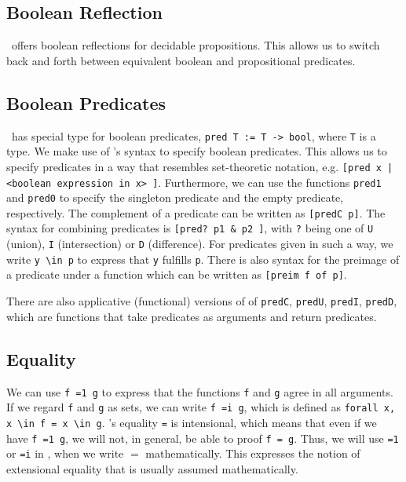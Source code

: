\subsection{Boolean Reflection}
\ssreflect\ offers boolean reflections for decidable propositions. 
This allows us to switch back and forth between equivalent boolean and propositional predicates.

\subsection{Boolean Predicates}
\ssreflect\ has special type for boolean predicates, \lstinline{pred T := T -> bool}, where \lstinline{T} is a type.
We make use of \ssreflect's syntax to specify boolean predicates.
This allows us to specify predicates in a way that resembles set-theoretic notation, e.g. 
\lstinline{[pred x | <boolean expression in x> ]}.
Furthermore, we can use the functions \lstinline{pred1} and \lstinline{pred0} to specify the singleton predicate and the empty predicate, respectively.
The complement of a predicate can be written as \lstinline{[predC p]}. 
The syntax for combining predicates is \lstinline{[pred? p1 & p2 ]}, with \lstinline{?} being one of 
\lstinline{U} (union), \lstinline{I} (intersection) or \lstinline{D} (difference).
For predicates given in such a way, we write \lstinline{y \in p} to express that \lstinline{y} fulfills \lstinline{p}.
There is also syntax for the preimage of a predicate under a function
which can be written as \lstinline{[preim f of p]}.



There are also applicative (functional) versions of of \lstinline{predC}, \lstinline{predU}, \lstinline{predI}, \lstinline{predD}, 
which are functions that take predicates as arguments and return predicates.

\subsection{Equality}
We can use \lstinline{f =1 g} to express that the functions \lstinline{f} and \lstinline{g} agree in all arguments.
If we regard \lstinline{f} and \lstinline{g} as sets, we can write \lstinline{f =i g}, which is defined as \lstinline{forall x, x \in f = x \in g}.
\coq's equality \lstinline{=} is intensional, which means that even if we have \lstinline{f =1 g}, we will not, in general, be able to proof \lstinline{f = g}.
Thus, we will use \lstinline{=1} or \lstinline{=i} in \coq, when we write $=$ mathematically. 
This expresses the notion of extensional equality that is usually assumed mathematically.



